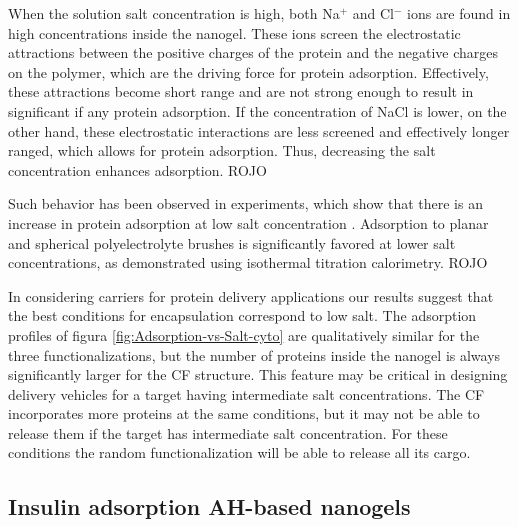 When the solution salt concentration is high, both Na$^+$ and Cl$^-$ ions are found in high concentrations inside the nanogel.
These ions screen the electrostatic attractions between the positive charges of the protein and the negative charges on the polymer, which are the driving force for protein adsorption.
Effectively, these attractions become short range and are not strong enough to result in significant if any protein adsorption.
If the concentration of NaCl is lower, on the other hand, these electrostatic interactions are less screened and effectively longer ranged, which allows for protein adsorption.
Thus, decreasing the salt concentration enhances adsorption.
ROJO 
{Such behavior has been observed in experiments, which show that there is an increase in protein adsorption at low salt concentration .
Adsorption to planar and spherical polyelectrolyte brushes is significantly favored at lower salt concentrations, as demonstrated using isothermal titration calorimetry. ROJO




In considering carriers for protein delivery applications our results suggest that the best conditions for encapsulation correspond to low salt.
The adsorption profiles of figura \ref{fig:Adsorption-vs-Salt-cyto} are qualitatively similar for the three functionalizations,
but the number of proteins inside the nanogel is always significantly larger for the CF structure.
This feature may be critical in designing delivery vehicles for a target having intermediate salt concentrations.
The CF incorporates more proteins at the same conditions, but it may not be able to release them if the target has intermediate salt concentration.
For these conditions the random functionalization will be able to release all its cargo.















\subsection{Insulin adsorption AH-based nanogels} 




}
